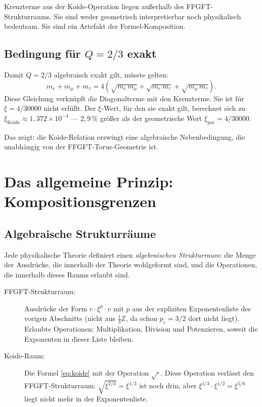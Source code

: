 \begin{keypoint}
Kreuzterme aus der Koide-Operation liegen außerhalb des FFGFT-Strukturraums.
Sie sind weder geometrisch interpretierbar noch physikalisch bedeutsam.
Sie sind ein Artefakt der Formel-Komposition.
\end{keypoint}

\subsection{Bedingung für $Q = 2/3$ exakt}

Damit $Q = 2/3$ algebraisch exakt gilt, müsste gelten:
\begin{equation}
  m_e + m_\mu + m_\tau = 4\left(\sqrt{m_e\,m_\mu} + \sqrt{m_e\,m_\tau} + \sqrt{m_\mu\,m_\tau}\right).
  \label{eq:bedingung}
\end{equation}
Diese Gleichung verknüpft die Diagonalterme mit den Kreuzterme.
Sie ist für $\xi = 4/30000$ nicht erfüllt. Der $\xi$-Wert, für den sie
exakt gilt, berechnet sich zu $\xi_{\text{Koide}} \approx 1{,}372 \times 10^{-4}$
— $2{,}9\,\%$ größer als der geometrische Wert $\xi_{\text{par}} = 4/30000$.

Das zeigt: die Koide-Relation erzwingt eine algebraische Nebenbedingung,
die unabhängig von der FFGFT-Torus-Geometrie ist.

\section{Das allgemeine Prinzip: Kompositionsgrenzen}

\subsection{Algebraische Strukturräume}

Jede physikalische Theorie definiert einen \emph{algebraischen Strukturraum}:
die Menge der Ausdrücke, die innerhalb der Theorie wohlgeformt sind, und die
Operationen, die innerhalb dieses Raums erlaubt sind.

\begin{description}
  \item[FFGFT-Strukturraum:] Ausdrücke der Form $r \cdot \xi^{p} \cdot v$
    mit $p$ aus der expliziten Exponentenliste des vorigen Abschnitts
    (nicht aus $\frac{1}{3}\mathbb{Z}$, da schon $p_e = 3/2$ dort nicht liegt).
    Erlaubte Operationen: Multiplikation, Division und Potenzieren, soweit
    die Exponenten in dieser Liste bleiben.
  \item[Koide-Raum:] Die Formel \eqref{eq:koide} mit der Operation
    $\sqrt{\cdot}$. Diese Operation verlässt den FFGFT-Strukturraum:
    $\sqrt{\xi^{2/3}} = \xi^{1/3}$ ist noch drin,
    aber $\xi^{1/3} \cdot \xi^{1/2} = \xi^{5/6}$ liegt nicht mehr in der Exponentenliste.
\end{description}

